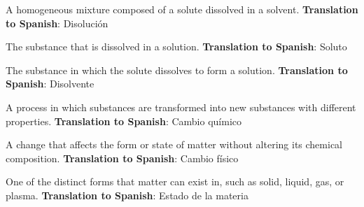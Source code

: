 \begin{vocabulary}[Solution]
A homogeneous mixture composed of a solute dissolved in a solvent. \newline
\textbf{Translation to Spanish}: Disolución \newline
\end{vocabulary}


\begin{vocabulary}[Solute]
The substance that is dissolved in a solution. \newline
\textbf{Translation to Spanish}: Soluto \newline
\end{vocabulary}


\begin{vocabulary}[Solvent]
The substance in which the solute dissolves to form a solution. \newline
\textbf{Translation to Spanish}: Disolvente \newline
\end{vocabulary}


\begin{vocabulary}
A process in which substances are transformed into new substances with different properties. \newline
\textbf{Translation to Spanish}: Cambio químico \newline
\end{vocabulary}


\begin{vocabulary}
A change that affects the form or state of matter without altering its chemical composition. \newline
\textbf{Translation to Spanish}: Cambio físico \newline
\end{vocabulary}


\begin{vocabulary}
One of the distinct forms that matter can exist in, such as solid, liquid, gas, or plasma. \newline
\textbf{Translation to Spanish}: Estado de la materia \newline
\end{vocabulary}



\newpage

